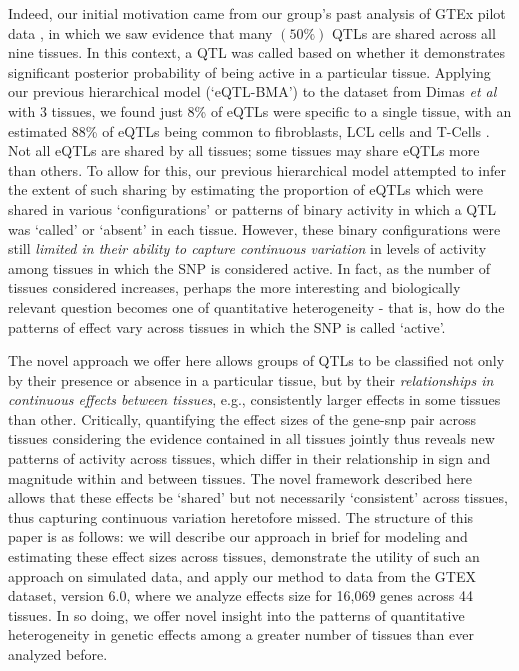 Indeed, our initial motivation came from our group's past analysis of GTEx pilot data \cite{consortium_genotype-tissue_2015}, in which we saw evidence that many $(50\%)$ QTLs are shared across all nine tissues. In this context, a QTL was called based on whether it demonstrates significant posterior probability of being active in a particular tissue. Applying our previous hierarchical model (`eQTL-BMA') to the dataset from Dimas {\it et al} \cite{dimas_common_2009} with 3 tissues, we found just 8\% of eQTLs were specific to a single tissue, with an estimated 88\% of eQTLs being common to fibroblasts, LCL cells and T-Cells \cite{flutre_statistical_2013}. Not all eQTLs are shared by all tissues; some tissues may share eQTLs more than others. To allow for this, our previous hierarchical model attempted to infer the extent of such sharing by estimating the proportion of eQTLs which were shared in various `configurations' or patterns of binary activity in which a QTL was `called' or `absent' in each tissue.
 However, these binary configurations were still \textit{limited in their ability to capture continuous variation} in levels of activity among tissues in which the SNP is considered active. 
 In fact, as the number of tissues considered increases, perhaps the more interesting and biologically relevant question becomes one of quantitative heterogeneity - that is, how do the patterns of effect vary across tissues in which the SNP is called `active'.  

The novel approach we offer here allows groups of QTLs to be classified not only by their presence or absence in a particular tissue, but by their  \textit{relationships in continuous effects between tissues}, e.g., consistently larger effects in some tissues than other. Critically, quantifying the effect sizes of the gene-snp pair across tissues considering the evidence contained in all tissues jointly thus reveals new patterns of activity across tissues, which differ in their relationship in sign and magnitude within and between tissues. The novel framework described here allows that these effects be `shared' but not necessarily `consistent' across tissues, thus capturing continuous variation heretofore missed. The structure of this paper is as follows: we will describe our approach in brief for modeling and estimating these effect sizes across tissues, demonstrate the utility of such an approach on simulated data, and apply our method to data from the GTEX dataset, version 6.0, where we analyze effects size for 16,069 genes across 44 tissues. In so doing, we offer novel insight into the patterns of quantitative heterogeneity in genetic effects among a greater number of tissues than ever analyzed before.
